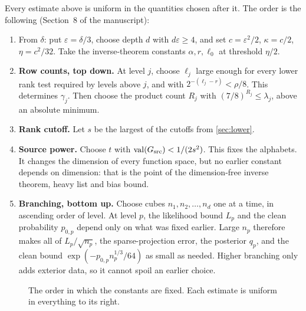 \documentclass[11pt]{article}
\theoremstyle{definition}
\theoremstyle{remark}
\newcommand{\eps}{\varepsilon}
\DeclareMathOperator{\val}{val}
\begin{document}
Every estimate above is uniform in the quantities chosen after it. The order
is the following (Section~8 of the manuscript):
\begin{enumerate}
\item From $\delta$: put $\eps=\delta/3$, choose depth $d$ with $d\eps\ge4$, and
set $c=\eps^2/2$, $\kappa=c/2$, $\eta=c^2/32$. Take the inverse-theorem
constants $\alpha,r,\ell_0$ at threshold $\eta/2$.
\item \textbf{Row counts, top down.} At level $j$, choose $\ell_j$ large enough
for every lower rank test required by levels above $j$, and with
$2^{-(\ell_j-r)}<\rho/8$. This determines $\gamma_j$. Then choose the product
count $R_j$ with $(7/8)^{R_j}\le\lambda_j$, above an absolute minimum.
\item \textbf{Rank cutoff.} Let $s$ be the largest of the cutoffs from
\cref{sec:lower}.
\item \textbf{Source power.} Choose $t$ with $\val(G_{\rm src})<1/(2s^2)$. This
fixes the alphabets. It changes the dimension of every function space, but no
earlier constant depends on dimension: that is the point of the
dimension-free inverse theorem, heavy list and bias bound.
\item \textbf{Branching, bottom up.} Choose cubes $n_1,n_2,\ldots,n_d$ one at a
time, in ascending order of level. At level $p$, the likelihood bound $L_p$ and the clean
probability $p_{0,p}$ depend only on what was fixed earlier. Large $n_p$
therefore makes all of $L_p/\sqrt{n_p}$, the sparse-projection error, the
posterior $q_p$, and the clean bound $\exp(-p_{0,p}n_p^{1/3}/64)$ as small as
needed. Higher branching only adds exterior data, so it cannot spoil an
earlier choice.
\end{enumerate}

\begin{figure}[h]
\centering
{}
\caption{The order in which the constants are fixed. Each estimate is
uniform in everything to its right.}
\label{fig:order}
\end{figure}
\end{document}
